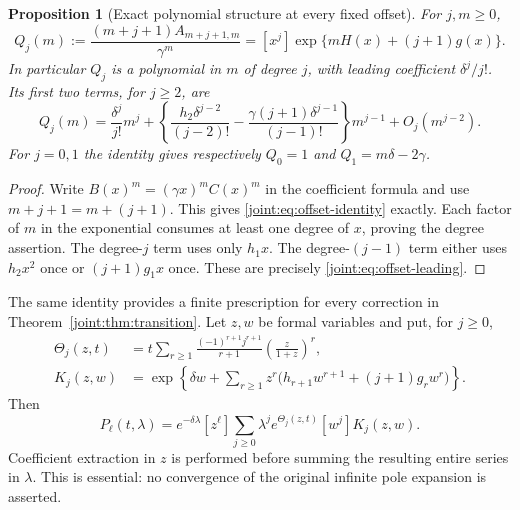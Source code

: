 \documentclass[11pt,a4paper]{article}
\numberwithin{equation}{section}
\theoremstyle{plain}
\newtheorem{proposition}[theorem]{Proposition}
\theoremstyle{definition}
\theoremstyle{remark}
\begin{document}
\begin{proposition}[Exact polynomial structure at every fixed offset]
\label{joint:prop:offset}
For $j,m\geq0$,
\begin{equation}\label{joint:eq:offset-identity}
 Q_j(m):=\frac{(m+j+1)A_{m+j+1,m}}{\gamma^m}
       =[x^j]\exp\{mH(x)+(j+1)g(x)\}.
\end{equation}
In particular $Q_j$ is a polynomial in $m$ of degree $j$, with
leading coefficient $\delta^j/j!$. Its first two terms, for $j\geq2$,
are
\begin{equation}\label{joint:eq:offset-leading}
 Q_j(m)=\frac{\delta^j}{j!}m^j
 +\left\{\frac{h_2\delta^{j-2}}{(j-2)!}
       -\frac{\gamma(j+1)\delta^{j-1}}{(j-1)!}\right\}m^{j-1}
 +O_j(m^{j-2}).
\end{equation}
For $j=0,1$ the identity gives respectively
$Q_0=1$ and $Q_1=m\delta-2\gamma$.
\end{proposition}
\begin{proof}
Write $B(x)^m=(\gamma x)^mC(x)^m$ in the coefficient formula
and use $m+j+1=m+(j+1)$. This gives
\eqref{joint:eq:offset-identity} exactly.
Each factor of $m$ in the exponential consumes at least one degree
of $x$, proving the degree assertion. The degree-$j$ term uses only
$h_1x$. The degree-$(j-1)$ term either uses $h_2x^2$ once or
$(j+1)g_1x$ once. These are precisely
\eqref{joint:eq:offset-leading}.
\end{proof}

The same identity provides a finite prescription for every correction
in Theorem~\ref{joint:thm:transition}. Let $z,w$ be formal variables and
put, for $j\geq0$,
\begin{align*}
 \Theta_j(z,t)
 &=t\sum_{r\geq1}\frac{(-1)^{r+1}j^{r+1}}{r+1}
                                  \left(\frac z{1+z}\right)^r,\\
 K_j(z,w)
 &=\exp\left\{\delta w+
      \sum_{r\geq1}z^r
        \bigl(h_{r+1}w^{r+1}+(j+1)g_rw^r\bigr)\right\}.
\end{align*}
Then
\begin{equation}\label{joint:eq:polynomial-prescription}
 \boxed{\displaystyle
 P_\ell(t,\lambda)=e^{-\delta\lambda}[z^\ell]
   \sum_{j\geq0}\lambda^j e^{\Theta_j(z,t)}[w^j]K_j(z,w).}
\end{equation}
Coefficient extraction in $z$ is performed before summing the
resulting entire series in $\lambda$. This is essential: no convergence
of the original infinite pole expansion is asserted.
\end{document}
